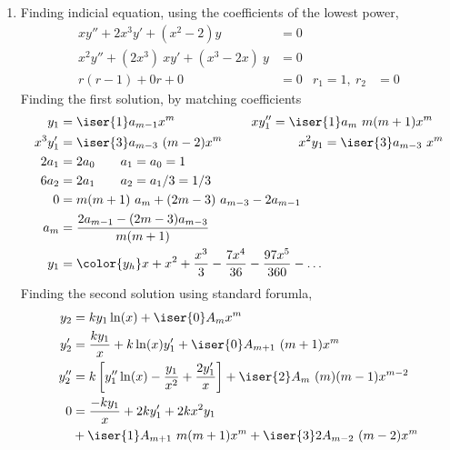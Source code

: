 \begin{enumerate}
    \item Finding indicial equation, using the coefficients of the lowest power,
          \begin{align}
              x y'' + 2x^3 y' + (x^2 - 2)y          & = 0   \\
              x^2 y'' + (2x^3)\ xy' + (x^3 - 2x)\ y & = 0   \\
              r(r - 1) + 0r + 0                     & = 0 &
              r_1 = 1,\ r_2                         & = 0
          \end{align}
          Finding the first solution, by matching coefficients
          \begin{align}
              y_1      & = \iser{1} a_{m-1} x^{m}
              \qquad\qquad\qquad x y_1'' = \iser{1} a_m\ m(m+1)x^{m}              \\
              x^3 y_1' & = \iser{3} a_{m-3}\ (m-2) x^{m}
              \qquad\qquad\qquad x^2y_1 = \iser{3} a_{m-3}\ x^{m}                 \\
              2a_1     & = 2a_0  \qquad a_1 = a_0 = 1                             \\
              6a_2     & = 2a_1  \qquad a_2 = a_1/3 = 1/3                         \\
              0        & = m(m+1)\ a_m + (2m-3)\ a_{m-3} - 2a_{m-1}               \\
              a_m      & = \frac{2 a_{m-1} - (2m-3) a_{m-3}}{m(m+1)}              \\
              y_1      & = {\color{y_h} x + x^2 + \frac{x^3}{3} - \frac{7x^4}{36}
              - \frac{97x^5}{360} - \dots}
          \end{align}
          Finding the second solution using standard forumla,
          \begin{align}
              y_2   & = ky_1\ln(x) + \iser{0}A_m x^m                             \\
              y_2'  & = \frac{ky_1}{x} + k\ln(x)y_1' + \iser{0}A_{m+1}\ (m+1)x^m \\
              y_2'' & = k\left[y_1'' \ln(x) - \frac{y_1}{x^2}
              + \frac{2y_1'}{x}\right] + \iser{2}A_m\ (m)(m-1)x^{m-2}            \\
              0     & = \frac{-ky_1}{x} + 2ky_1' + 2kx^2y_1                      \\
                    & + \iser{1}A_{m+1}\ m(m+1) x^m
              + \iser{3}2 A_{m-2}\ (m-2) x^{m}                                   \\

\end{align}
\end{enumerate}
